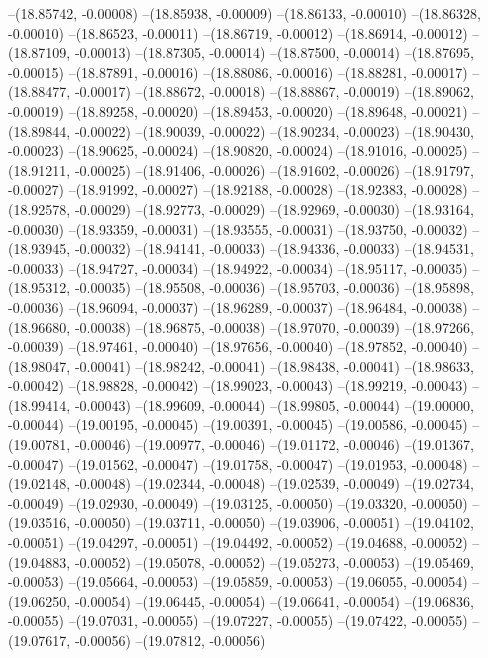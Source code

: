 --(18.85742, -0.00008)
--(18.85938, -0.00009)
--(18.86133, -0.00010)
--(18.86328, -0.00010)
--(18.86523, -0.00011)
--(18.86719, -0.00012)
--(18.86914, -0.00012)
--(18.87109, -0.00013)
--(18.87305, -0.00014)
--(18.87500, -0.00014)
--(18.87695, -0.00015)
--(18.87891, -0.00016)
--(18.88086, -0.00016)
--(18.88281, -0.00017)
--(18.88477, -0.00017)
--(18.88672, -0.00018)
--(18.88867, -0.00019)
--(18.89062, -0.00019)
--(18.89258, -0.00020)
--(18.89453, -0.00020)
--(18.89648, -0.00021)
--(18.89844, -0.00022)
--(18.90039, -0.00022)
--(18.90234, -0.00023)
--(18.90430, -0.00023)
--(18.90625, -0.00024)
--(18.90820, -0.00024)
--(18.91016, -0.00025)
--(18.91211, -0.00025)
--(18.91406, -0.00026)
--(18.91602, -0.00026)
--(18.91797, -0.00027)
--(18.91992, -0.00027)
--(18.92188, -0.00028)
--(18.92383, -0.00028)
--(18.92578, -0.00029)
--(18.92773, -0.00029)
--(18.92969, -0.00030)
--(18.93164, -0.00030)
--(18.93359, -0.00031)
--(18.93555, -0.00031)
--(18.93750, -0.00032)
--(18.93945, -0.00032)
--(18.94141, -0.00033)
--(18.94336, -0.00033)
--(18.94531, -0.00033)
--(18.94727, -0.00034)
--(18.94922, -0.00034)
--(18.95117, -0.00035)
--(18.95312, -0.00035)
--(18.95508, -0.00036)
--(18.95703, -0.00036)
--(18.95898, -0.00036)
--(18.96094, -0.00037)
--(18.96289, -0.00037)
--(18.96484, -0.00038)
--(18.96680, -0.00038)
--(18.96875, -0.00038)
--(18.97070, -0.00039)
--(18.97266, -0.00039)
--(18.97461, -0.00040)
--(18.97656, -0.00040)
--(18.97852, -0.00040)
--(18.98047, -0.00041)
--(18.98242, -0.00041)
--(18.98438, -0.00041)
--(18.98633, -0.00042)
--(18.98828, -0.00042)
--(18.99023, -0.00043)
--(18.99219, -0.00043)
--(18.99414, -0.00043)
--(18.99609, -0.00044)
--(18.99805, -0.00044)
--(19.00000, -0.00044)
--(19.00195, -0.00045)
--(19.00391, -0.00045)
--(19.00586, -0.00045)
--(19.00781, -0.00046)
--(19.00977, -0.00046)
--(19.01172, -0.00046)
--(19.01367, -0.00047)
--(19.01562, -0.00047)
--(19.01758, -0.00047)
--(19.01953, -0.00048)
--(19.02148, -0.00048)
--(19.02344, -0.00048)
--(19.02539, -0.00049)
--(19.02734, -0.00049)
--(19.02930, -0.00049)
--(19.03125, -0.00050)
--(19.03320, -0.00050)
--(19.03516, -0.00050)
--(19.03711, -0.00050)
--(19.03906, -0.00051)
--(19.04102, -0.00051)
--(19.04297, -0.00051)
--(19.04492, -0.00052)
--(19.04688, -0.00052)
--(19.04883, -0.00052)
--(19.05078, -0.00052)
--(19.05273, -0.00053)
--(19.05469, -0.00053)
--(19.05664, -0.00053)
--(19.05859, -0.00053)
--(19.06055, -0.00054)
--(19.06250, -0.00054)
--(19.06445, -0.00054)
--(19.06641, -0.00054)
--(19.06836, -0.00055)
--(19.07031, -0.00055)
--(19.07227, -0.00055)
--(19.07422, -0.00055)
--(19.07617, -0.00056)
--(19.07812, -0.00056)
